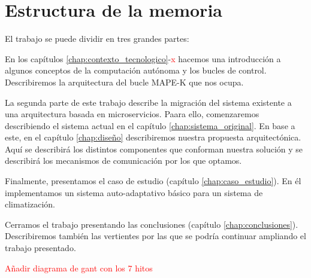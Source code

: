 \section{Estructura de la memoria}

El trabajo se puede dividir en tres grandes partes:

En los capítulos \ref{chap:contexto_tecnologico}-\textcolor{red}{x} hacemos una introducción a algunos conceptos de la computación autónoma y los bucles de control. Describiremos la arquitectura del bucle MAPE-K que nos ocupa.

La segunda parte de este trabajo describe la migración del sistema existente a una arquitectura basada en microservicios. Paara ello, comenzaremos describiendo el sistema actual en el capítulo \ref{chap:sistema_original}. En base a este, en el capítulo \ref{chap:diseño} describiremos nuestra propuesta arquitectónica. Aquí se describirá los distintos componentes que conforman nuestra solución y se describirá los mecanismos de comunicación por los que optamos.

Finalmente, presentamos el caso de estudio (capítulo \ref{chap:caso_estudio}). En él implementamos un sistema auto-adaptativo básico para un sistema de climatización.

Cerramos el trabajo presentando las conclusiones (capítulo \ref{chap:conclusiones}). Describiremos también las vertientes por las que se podría continuar ampliando el trabajo presentado.



\textcolor{red}{Añadir diagrama de gant con los 7 hitos}
